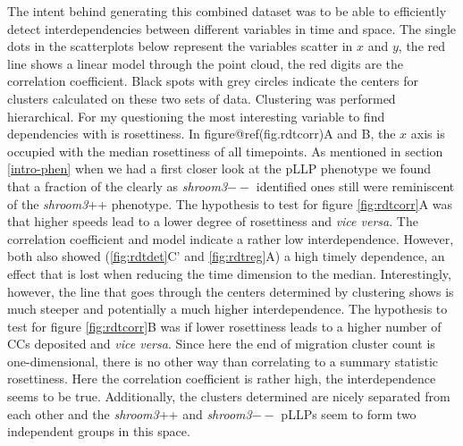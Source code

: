 \documentclass[11pt,singlespacinge,twoside]{reedthesis} %
\begin{document}
The intent behind generating this combined dataset was to be able to efficiently detect interdependencies between different variables in time and space. The single dots in the scatterplots below represent the variables scatter in \(x\) and \(y\), the red line shows a linear model through the point cloud, the red digits are the correlation coefficient. Black spots with grey circles indicate the centers for clusters calculated on these two sets of data. Clustering was performed hierarchical.
For my questioning the most interesting variable to find dependencies with is rosettiness. In figure@ref(fig.rdtcorr)A and B, the \(x\) axis is occupied with the median rosettiness of all timepoints. As mentioned in section \ref{intro-phen} when we had a first closer look at the pLLP phenotype we found that a fraction of the clearly as \emph{shroom3}\(--\) identified ones still were reminiscent of the \emph{shroom3}++ phenotype. The hypothesis to test for figure \ref{fig:rdtcorr}A was that higher speeds lead to a lower degree of rosettiness and \emph{vice versa}. The correlation coefficient and model indicate a rather low interdependence. However, both also showed (\ref{fig:rdtdet}C' and \ref{fig:rdtreg}A) a high timely dependence, an effect that is lost when reducing the time dimension to the median. Interestingly, however, the line that goes through the centers determined by clustering shows is much steeper and potentially a much higher interdependence.
The hypothesis to test for figure \ref{fig:rdtcorr}B was if lower rosettiness leads to a higher number of CCs deposited and \emph{vice versa}. Since here the end of migration cluster count is one-dimensional, there is no other way than correlating to a summary statistic rosettiness. Here the correlation coefficient is rather high, the interdependence seems to be true. Additionally, the clusters determined are nicely separated from each other and the \emph{shroom3}++ and \emph{shroom3}\(--\) pLLPs seem to form two independent groups in this space.
\end{document}
